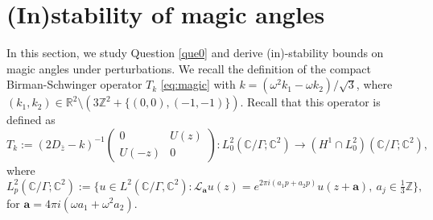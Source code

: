 \documentclass[reqno,12pt,letterpaper]{amsart}
\newcommand{\CC}{{\mathbb C}}
\newcommand{\ZZ}{{\mathbb Z}}
\numberwithin{equation}{section}
\begin{document}
\section{(In)stability of magic angles} 
\label{sec:stability}
In this section, we study Question \ref{que0} and derive (in)-stability bounds on magic angles under perturbations. 
We recall the definition of the compact Birman-Schwinger operator $ T_{k } $ \eqref{eq:magic} with $ k = ( \omega^2 k_1 -
 \omega k_2 )/\sqrt 3$, where $ ( k_1, k_2 ) \in \mathbb R^2 \setminus (3 \ZZ^2 + \{ (0,0), (-1,-1) \})$. Recall that this operator is defined as 
\[   T_{k} :=(2D_{\bar z}-k)^{-1} \begin{pmatrix} 0
  &  U(z)  \\
U(-z) & 0
\end{pmatrix} :  L^2_{0}  (  \mathbb C/\Gamma ; \mathbb C^2 ) \to 
( H^1 \cap L^2_{0} ) (  \mathbb C/\Gamma ; \mathbb C^2 ) ,  \]
where
\begin{equation*}
 L^2_{ p } (  \mathbb C/\Gamma; \mathbb C^2  ) :=
\Big\{ u \in  L^2 (  \mathbb C/\Gamma, \CC^2 ) : 
\mathscr L_{\mathbf a } u(z) = e^{ 2 \pi i ( a_1 p + a_2 p ) } u(z+\mathbf a) , \ 
a_j \in \tfrac13 \mathbb Z \Big\} , \end{equation*}
for $\mathbf a = 4 \pi i( \omega a_1 + \omega^2 a_2 ).$ 
\end{document}

